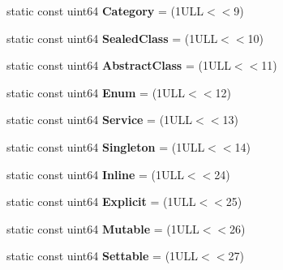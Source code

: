 \begin{DoxyCompactItemize}
\item 
\hypertarget{class_entry_a8553ff79a2eb448d989de84158be11f7}{static const uint64 {\bfseries Category} = (1\-U\-L\-L$<$$<$9)}\label{class_entry_a8553ff79a2eb448d989de84158be11f7}

\item 
\hypertarget{class_entry_adf493d36e7824c58e7c5d3e990ccb2db}{static const uint64 {\bfseries Sealed\-Class} = (1\-U\-L\-L$<$$<$10)}\label{class_entry_adf493d36e7824c58e7c5d3e990ccb2db}

\item 
\hypertarget{class_entry_afe4ac42aa2931726328b75e133127c1a}{static const uint64 {\bfseries Abstract\-Class} = (1\-U\-L\-L$<$$<$11)}\label{class_entry_afe4ac42aa2931726328b75e133127c1a}

\item 
\hypertarget{class_entry_ae9e0131ab0b75769cdf2e78ab49d2f1b}{static const uint64 {\bfseries Enum} = (1\-U\-L\-L$<$$<$12)}\label{class_entry_ae9e0131ab0b75769cdf2e78ab49d2f1b}

\item 
\hypertarget{class_entry_af169e4da0c224420f2b0932916f776b5}{static const uint64 {\bfseries Service} = (1\-U\-L\-L$<$$<$13)}\label{class_entry_af169e4da0c224420f2b0932916f776b5}

\item 
\hypertarget{class_entry_ae2beb99a622ad9c36683b722f7ce3f1f}{static const uint64 {\bfseries Singleton} = (1\-U\-L\-L$<$$<$14)}\label{class_entry_ae2beb99a622ad9c36683b722f7ce3f1f}

\item 
\hypertarget{class_entry_a48c58c5654f0e249c909f7469952da28}{static const uint64 {\bfseries Inline} = (1\-U\-L\-L$<$$<$24)}\label{class_entry_a48c58c5654f0e249c909f7469952da28}

\item 
\hypertarget{class_entry_a4a3e77dca7768313c9414811eaff7ec2}{static const uint64 {\bfseries Explicit} = (1\-U\-L\-L$<$$<$25)}\label{class_entry_a4a3e77dca7768313c9414811eaff7ec2}

\item 
\hypertarget{class_entry_a64a009c590753ba70702ea6ca136e7d4}{static const uint64 {\bfseries Mutable} = (1\-U\-L\-L$<$$<$26)}\label{class_entry_a64a009c590753ba70702ea6ca136e7d4}

\item 
\hypertarget{class_entry_a815f31685203283ae3efd08535f246ff}{static const uint64 {\bfseries Settable} = (1\-U\-L\-L$<$$<$27)}\label{class_entry_a815f31685203283ae3efd08535f246ff}


\end{DoxyCompactItemize}
